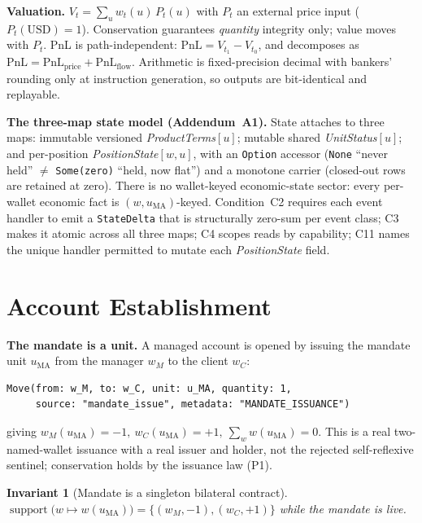 \documentclass[11pt,a4paper]{article}
\newtheorem{invariant}[definition]{Invariant}
\begin{document}
\noindent\textbf{Valuation.} $V_t=\sum_{u}w_t(u)\,P_t(u)$ with $P_t$ an external price input
($P_t(\text{USD})=1$). Conservation guarantees \emph{quantity} integrity only; value moves with
$P_t$. PnL is path-independent: $\mathrm{PnL}=V_{t_1}-V_{t_0}$, and decomposes as
$\mathrm{PnL}=\mathrm{PnL}_{\text{price}}+\mathrm{PnL}_{\text{flow}}$. Arithmetic is
fixed-precision decimal with bankers' rounding only at instruction generation, so outputs are
bit-identical and replayable.

\noindent\textbf{The three-map state model (Addendum~A1).} State attaches to three maps:
immutable versioned \textit{ProductTerms}$[u]$; mutable shared \textit{UnitStatus}$[u]$; and
per-position \textit{PositionState}$[w,u]$, with an \texttt{Option} accessor (\texttt{None}
``never held'' $\neq$ \texttt{Some(zero)} ``held, now flat'') and a monotone carrier (closed-out
rows are retained at zero). There is no wallet-keyed economic-state sector: every per-wallet
economic fact is $(w,u_{\mathrm{MA}})$-keyed. Condition~C2 requires each event handler to emit a
\texttt{StateDelta} that is structurally zero-sum per event class; C3 makes it atomic across all
three maps; C4 scopes reads by capability; C11 names the unique handler permitted to mutate each
\textit{PositionState} field.

\section{Account Establishment}
\label{sec:establishment}

\noindent\textbf{The mandate is a unit.} A managed account is opened by issuing the mandate unit
$u_{\mathrm{MA}}$ from the manager $w_M$ to the client $w_C$:
\begin{lstlisting}
Move(from: w_M, to: w_C, unit: u_MA, quantity: 1,
     source: "mandate_issue", metadata: "MANDATE_ISSUANCE")
\end{lstlisting}
giving $w_M(u_{\mathrm{MA}})=-1,\ w_C(u_{\mathrm{MA}})=+1,\ \sum_w w(u_{\mathrm{MA}})=0$. This is
a real two-named-wallet issuance with a real issuer and holder, not the rejected self-reflexive
sentinel; conservation holds by the issuance law (P1).

\begin{invariant}[Mandate is a singleton bilateral contract]
\label{inv:singleton}
$\operatorname{support}\big(w\mapsto w(u_{\mathrm{MA}})\big)=\{(w_M,-1),(w_C,+1)\}$ while the
mandate is live.
\end{invariant}
\end{document}
